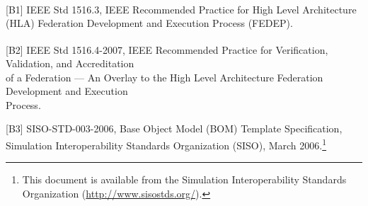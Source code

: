 
\newpage
\thispagestyle{hlabibliography}

\renewcommand{\footnoterule}{\kern-3pt\hrule width 0.40in\kern2.6pt}
\makeatletter
\renewcommand{\@makefntext}[1]{\noindent\@makefnmark#1}
\makeatother
\renewcommand{\footnotefont}{\fontsize{7.98pt}{10.8pt}\selectfont}
\enlargethispage{-2.0pt}

\addtolength{\topskip}{1.5pt}
\vspace{1.5pt}
\vspace{-7pt}
\vspace{-7.5pt}
\vspace{-11.9pt}

[B1] IEEE Std 1516.3\textsuperscript{\texttrademark}, IEEE Recommended Practice for High Level Architecture (HLA) Federation Development and Execution Process (FEDEP).

\vspace{6pt}
[B2] IEEE Std 1516.4\textsuperscript{\texttrademark}-2007, IEEE Recommended Practice for Verification, Validation, and Accreditation\\
of a Federation --- An Overlay to the High Level Architecture Federation Development and Execution\\
Process.

\vspace{6pt}
[B3] SISO-STD-003-2006, Base Object Model (BOM) Template Specification, Simulation Interoperability Standards Organization (SISO), March 2006.\footnote{This document is available from the Simulation Interoperability Standards Organization (\href{http://www.sisostds.org/}{http://www.sisostds.org/}).}
